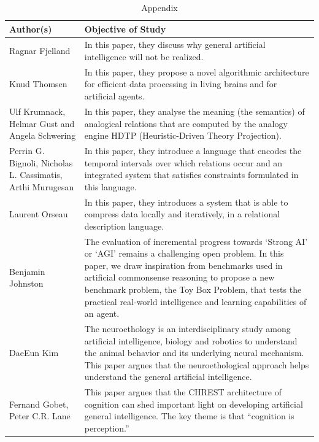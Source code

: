 \documentclass{article}
\begin{document}
    

\begin{table}
    \caption{Appendix}
    \centering

    \renewcommand{\arraystretch}{3}
    
    \begin{tabular}{ |p{5cm}|p{10cm}|  }
    \hline
    Author(s) & Objective of Study\\
    \hline
    
    Ragnar Fjelland & In this paper, they discuss why general artificial intelligence will not be realized. \\

    Knud Thomsen & In this paper, they propose a novel algorithmic architecture for efficient data processing in living brains and for artificial agents. \\

    Ulf Krumnack, Helmar Gust and Angela Schwering & In this paper, they analyse the meaning (the semantics) of analogical relations that are computed by the analogy engine HDTP (Heuristic-Driven Theory Projection). \\

    Perrin G. Bignoli, Nicholas L. Cassimatis, Arthi Murugesan & In this paper, they introduce a language that encodes the temporal intervals over which relations occur and an integrated system that satisfies constraints formulated in this language. \\

    Laurent Orseau & In this paper, they introduces a system that is able to compress data locally and iteratively, in a relational description language. \\

    Benjamin Johnston & The evaluation of incremental progress towards ‘Strong AI’ or ‘AGI’ remains a challenging open problem. In this paper, we draw inspiration from benchmarks used in artificial commonsense reasoning to propose a new benchmark problem, the Toy Box Problem, that tests the practical real-world intelligence and learning capabilities of an agent. \\
    
    DaeEun Kim & The neuroethology is an interdisciplinary study among artificial intelligence, biology and robotics to understand the animal behavior and its underlying neural mechanism. This paper argues that the neuroethological approach helps understand the general artificial intelligence.\\

    Fernand Gobet, Peter C.R. Lane & This paper argues that the CHREST architecture of cognition can shed important light on developing artificial general intelligence. The key theme is that “cognition is perception.” \\

    \hline
    \end{tabular}
\end{table}
\end{document}
